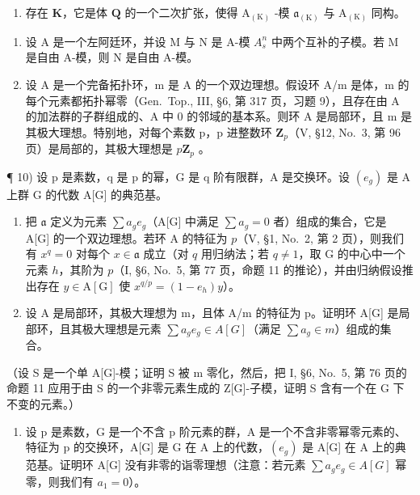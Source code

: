 \begin{enumerate}
\def\labelenumi{\alph{enumi})}
\setcounter{enumi}{2}
\tightlist
\item
  存在 \(\mathbf{K}\)，它是体 \(\mathbf{Q}\) 的一个二次扩张，使得 \(\mathrm{A}_{(\mathrm{K})}\) -模 \(\mathfrak{a}_{(\mathrm{K})}\) 与 \(\mathrm{A}_{(\mathrm{K})}\) 同构。
\end{enumerate}

\begin{enumerate}
\def\labelenumi{\arabic{enumi})}
\setcounter{enumi}{7}
\item
  设 A 是一个左阿廷环，并设 M 与 N 是 A-模 \(A_{s}^{n}\) 中两个互补的子模。若 M 是自由 A-模，则 N 是自由 A-模。
\item
  设 A 是一个完备拓扑环，m 是 A 的一个双边理想。假设环 A/m 是体，m 的每个元素都拓扑幂零（Gen.~Top., III, §6, 第 317 页，习题 9），且存在由 A 的加法群的子群组成的、A 中 0 的邻域的基本系。则环 A 是局部环，且 m 是其极大理想。特别地，对每个素数 p，p 进整数环 \(\mathbf{Z}_{p}\)（V, §12, No.~3, 第 96 页）是局部的，其极大理想是 \(p\mathbf{Z}_{p}\) 。
\end{enumerate}

¶ 10) 设 p 是素数，q 是 p 的幂，G 是 q 阶有限群，A 是交换环。设 \((e_{g})\) 是 A 上群 G 的代数 A{[}G{]} 的典范基。

\begin{enumerate}
\def\labelenumi{\alph{enumi})}
\item
  把 \(\mathfrak{a}\) 定义为元素 \(\sum a_{g}e_{g}\)（A{[}G{]} 中满足 \(\sum a_{g} = 0\) 者）组成的集合，它是 A{[}G{]} 的一个双边理想。若环 A 的特征为 \(p\)（V, §1, No.~2, 第 2 页），则我们有 \(x^{q} = 0\) 对每个 \(x\in \mathfrak{a}\) 成立（对 \(q\) 用归纳法；若 \(q\neq 1\)，取 G 的中心中一个元素 \(h\)，其阶为 \(p\)（I, §6, No.~5, 第 77 页，命题 11 的推论），并由归纳假设推出存在 \(y\in \mathrm{A}[\mathrm{G}]\) 使 \(x^{q / p} = (1 - e_h)y\)）。
\item
  设 A 是局部环，其极大理想为 m，且体 A/m 的特征为 p。证明环 A{[}G{]} 是局部环，且其极大理想是元素 \(\sum a_{g}e_{g}\in A[G]\)（满足 \(\sum a_{g}\in m\)）组成的集合。
\end{enumerate}

（设 S 是一个单 A{[}G{]}-模；证明 S 被 m 零化，然后，把 I, §6, No.~5, 第 76 页的命题 11 应用于由 S 的一个非零元素生成的 Z{[}G{]}-子模，证明 S 含有一个在 G 下不变的元素。）

\begin{enumerate}
\def\labelenumi{\arabic{enumi})}
\setcounter{enumi}{10}
\tightlist
\item
  设 p 是素数，G 是一个不含 p 阶元素的群，A 是一个不含非零幂零元素的、特征为 p 的交换环，A{[}G{]} 是 G 在 A 上的代数，\((e_{g})\) 是 A{[}G{]} 在 A 上的典范基。证明环 A{[}G{]} 没有非零的诣零理想（注意：若元素 \(\sum a_{g}e_{g} \in A[G]\) 幂零，则我们有 \(a_{1} = 0\)）。
\end{enumerate}

